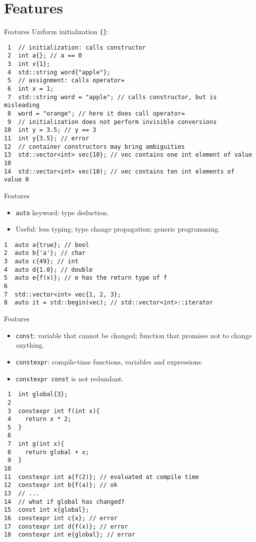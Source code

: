 \documentclass[presentation]{beamer}
\begin{document}
\section{Features}
\label{sec:orgfd16063}
\begin{frame}[label={sec:orgefdb4dd},fragile]{Features}
 Uniform initialization \texttt{\{\}}:

\begin{verbatim}
 1  // initialization: calls constructor
 2  int a{}; // a == 0
 3  int x{1};
 4  std::string word{"apple"};
 5  // assignment: calls operator=
 6  int x = 1;
 7  std::string word = "apple"; // calls constructor, but is misleading
 8  word = "orange"; // here it does call operator=
 9  // initialization does not perform invisible conversions
10  int y = 3.5; // y == 3
11  int y{3.5}; // error
12  // container constructors may bring ambiguities
13  std::vector<int> vec{10}; // vec contains one int element of value 10
14  std::vector<int> vec(10); // vec contains ten int elements of value 0
\end{verbatim}
\end{frame}

\begin{frame}[label={sec:org1863c32},fragile]{Features}
 \begin{itemize}
\item \texttt{auto} keyword: type deduction.
\item Useful: less typing; type change propagation; generic programming.
\end{itemize}

\begin{verbatim}
1  auto a{true}; // bool
2  auto b{'a'}; // char
3  auto c{49}; // int
4  auto d{1.0}; // double
5  auto e{f(x)}; // e has the return type of f
6  
7  std::vector<int> vec{1, 2, 3};
8  auto it = std::begin(vec); // std::vector<int>::iterator
\end{verbatim}
\end{frame}

\begin{frame}[label={sec:org8e3744d},fragile]{Features}
 \begin{itemize}
\item \texttt{const}: variable that cannot be changed; function that promises
not to change anything.
\item \texttt{constexpr}: compile-time functions, variables and expressions.
\item \texttt{constexpr const} is not redundant.
\end{itemize}

\begin{verbatim}
 1  int global{3};
 2  
 3  constexpr int f(int x){
 4    return x * 2;
 5  }
 6  
 7  int g(int x){
 8    return global + x;
 9  }
10  
11  constexpr int a{f(2)}; // evaluated at compile time
12  constexpr int b{f(a)}; // ok
13  // ...
14  // what if global has changed?
15  const int x{global};
16  constexpr int c{x}; // error
17  constexpr int d{f(x)}; // error
18  constexpr int e{global}; // error
\end{verbatim}
\end{frame}
\end{document}
